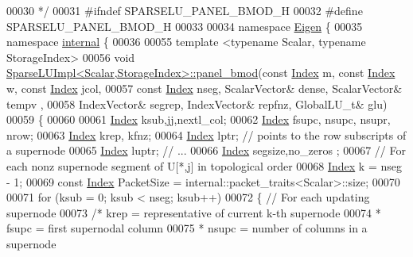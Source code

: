 \begin{DoxyCode}
00030 \textcolor{comment}{ */}
00031 \textcolor{preprocessor}{#ifndef SPARSELU\_PANEL\_BMOD\_H}
00032 \textcolor{preprocessor}{#define SPARSELU\_PANEL\_BMOD\_H}
00033 
00034 \textcolor{keyword}{namespace }\hyperlink{namespace_eigen}{Eigen} \{
00035 \textcolor{keyword}{namespace }\hyperlink{namespaceinternal}{internal} \{
00036 
00055 \textcolor{keyword}{template} <\textcolor{keyword}{typename} Scalar, \textcolor{keyword}{typename} StorageIndex>
00056 \textcolor{keywordtype}{void} \hyperlink{group___sparse_l_u___module_a277936738db49e25285164ac25c498c3}{SparseLUImpl<Scalar,StorageIndex>::panel\_bmod}(\textcolor{keyword}{const} 
      \hyperlink{namespace_eigen_a62e77e0933482dafde8fe197d9a2cfde}{Index} m, \textcolor{keyword}{const} \hyperlink{namespace_eigen_a62e77e0933482dafde8fe197d9a2cfde}{Index} w, \textcolor{keyword}{const} \hyperlink{namespace_eigen_a62e77e0933482dafde8fe197d9a2cfde}{Index} jcol, 
00057                                             \textcolor{keyword}{const} \hyperlink{namespace_eigen_a62e77e0933482dafde8fe197d9a2cfde}{Index} nseg, ScalarVector& dense, ScalarVector& tempv
      ,
00058                                             IndexVector& segrep, IndexVector& repfnz, GlobalLU\_t& glu)
00059 \{
00060   
00061   \hyperlink{namespace_eigen_a62e77e0933482dafde8fe197d9a2cfde}{Index} ksub,jj,nextl\_col; 
00062   \hyperlink{namespace_eigen_a62e77e0933482dafde8fe197d9a2cfde}{Index} fsupc, nsupc, nsupr, nrow; 
00063   \hyperlink{namespace_eigen_a62e77e0933482dafde8fe197d9a2cfde}{Index} krep, kfnz; 
00064   \hyperlink{namespace_eigen_a62e77e0933482dafde8fe197d9a2cfde}{Index} lptr; \textcolor{comment}{// points to the row subscripts of a supernode }
00065   \hyperlink{namespace_eigen_a62e77e0933482dafde8fe197d9a2cfde}{Index} luptr; \textcolor{comment}{// ...}
00066   \hyperlink{namespace_eigen_a62e77e0933482dafde8fe197d9a2cfde}{Index} segsize,no\_zeros ; 
00067   \textcolor{comment}{// For each nonz supernode segment of U[*,j] in topological order}
00068   \hyperlink{namespace_eigen_a62e77e0933482dafde8fe197d9a2cfde}{Index} k = nseg - 1; 
00069   \textcolor{keyword}{const} \hyperlink{namespace_eigen_a62e77e0933482dafde8fe197d9a2cfde}{Index} PacketSize = internal::packet\_traits<Scalar>::size;
00070   
00071   \textcolor{keywordflow}{for} (ksub = 0; ksub < nseg; ksub++)
00072   \{ \textcolor{comment}{// For each updating supernode}
00073     \textcolor{comment}{/* krep = representative of current k-th supernode}
00074 \textcolor{comment}{     * fsupc =  first supernodal column}
00075 \textcolor{comment}{     * nsupc = number of columns in a supernode}

\end{DoxyCode}
